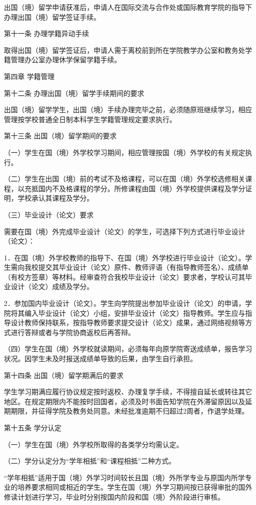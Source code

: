 \documentclass[UTF8,12pt,a4paper]{report}
\begin{document}
出国（境）留学申请获准后，申请人在国际交流与合作处或国际教育学院的指导下办理出国（境）留学签证手续。

第十一条 办理学籍异动手续

取得出国（境）留学签证后，申请人需于离校前到所在学院教学办公室和教务处学籍管理办公室办理休学保留学籍手续。

第四章 学籍管理

第十二条 办理出国（境）留学手续期间的要求

出国（境）留学学生，出国（境）手续办理完毕之前，必须随原班继续学习，相应管理按学校普通全日制本科学生学籍管理规定要求执行。

第十三条 出国（境）留学期间的要求

（一）学生在国（境）外学校学习期间，相应管理按国（境）外学校的有关规定执行。

（二）学生在出国（境）前的考试不及格课程，可以在国（境）外学校选修相关课程，以充抵国内不及格课程的学分。所修课程由国（境）外学校提供课程及学分证明，学校承认其课程及学分。

（三）毕业设计（论文）要求

需要在国（境）外完成毕业设计（论文）的学生，可选择下列方式进行毕业设计（论文）：

1．在国（境）外学校教师的指导下、在国（境）外学校进行毕业设计（论文）。学生需向我校提交其毕业设计（论文）原件、教师评语（有指导教师签名）、成绩单（有校方签章）等材料。经审查符合我校毕业设计（论文）要求者，学校认可其毕业设计（论文）成绩及学分。

2．参加国内毕业设计（论文）。学生向学院提出参加毕业设计（论文）的申请，学院将其编入毕业设计（论文）小组，安排毕业设计（论文）指导教师。学生应与指导设计教师保持联系，按指导教师要求提交设计（论文）成果，通过网络视频等方式进行答辩或者与学院协商返校后再答辩。

（四）学生在国（境）外学校就读期间，必须每年向原学院寄送成绩单，报告学习状况。因学生未及时报送成绩单导致的后果，由学生自行承担。

第十四条 出国（境）留学期满后的要求

学生学习期满应履行协议规定按时返校、办理复学手续，不得擅自延长或转往其它地区。在规定期限内不能按时回国者，必须及时书面告知学院在外滞留原因以及延期期限，并征得学院及教务处同意。未经批准逾期不归超过2周者，作退学处理。

第十五条 学分认定

（一）学生在国（境）外学校所取得的各类学分均需认定。

（二）学分认定分为“学年相抵”和“课程相抵”二种方式。

“学年相抵”适用于国（境）外学习时间较长且国（境）外所学专业与原国内所学专业的培养要求相同或相近的学生。学生在国（境）外学习期间按已获得审批的国外修读计划进行学习，毕业时分别按国内阶段和国（境）外阶段进行审核。
\end{document}
